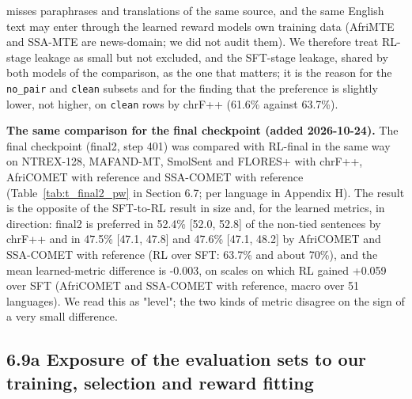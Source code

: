 misses paraphrases and translations of the same source, and the same English text may enter through the learned reward models\textquotesingle{} own training data (AfriMTE and SSA-MTE are news-domain; we did not audit them). We therefore treat RL-stage leakage as small but not excluded, and the SFT-stage leakage, shared by both models of the comparison, as the one that matters; it is the reason for the \texttt{no\_pair} and \texttt{clean} subsets and for the finding that the preference is slightly lower, not higher, on \texttt{clean} rows by chrF++ (61.6\% against 63.7\%).

\textbf{The same comparison for the final checkpoint (added 2026-10-24).} The final checkpoint (final2, step 401) was compared with RL-final in the same way on NTREX-128, MAFAND-MT, SmolSent and FLORES+ with chrF++, AfriCOMET with reference and SSA-COMET with reference (Table~\ref{tab:t_final2_pw} in Section 6.7; per language in Appendix H). The result is the opposite of the SFT-to-RL result in size and, for the learned metrics, in direction: final2 is preferred in 52.4\% {[}52.0, 52.8{]} of the non-tied sentences by chrF++ and in 47.5\% {[}47.1, 47.8{]} and 47.6\% {[}47.1, 48.2{]} by AfriCOMET and SSA-COMET with reference (RL over SFT: 63.7\% and about 70\%), and the mean learned-metric difference is -0.003, on scales on which RL gained +0.059 over SFT (AfriCOMET and SSA-COMET with reference, macro over 51 languages). We read this as "level"; the two kinds of metric disagree on the sign of a very small difference.

\subsection{6.9a Exposure of the evaluation sets to our training, selection and reward fitting}\label{a-exposure-of-the-evaluation-sets-to-our-training-selection-and-reward-fitting}

